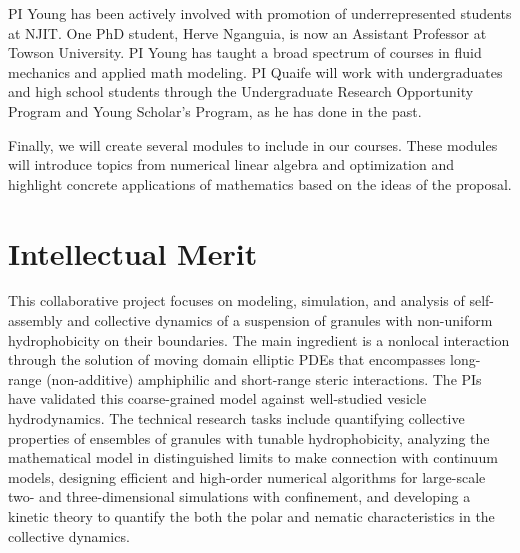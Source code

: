 PI Young has been actively involved with promotion of
underrepresented students at NJIT. One PhD student, Herve Nganguia, is
now an Assistant Professor at Towson University. PI Young has taught a
broad spectrum of courses in fluid mechanics and applied math modeling.
PI Quaife will work with undergraduates and high school
students through the Undergraduate Research Opportunity Program and
Young Scholar's Program, as he has done in the past.

Finally, we will
create several modules to include in our courses. These modules will
introduce topics from numerical linear algebra and optimization and
highlight concrete applications of mathematics based on the ideas of the
proposal.

\section{Intellectual Merit}
\label{sec:IntellectualMerit}
This collaborative project focuses on modeling, simulation, and analysis
of self-assembly and collective dynamics of a suspension of granules with 
non-uniform hydrophobicity on their boundaries. The main
ingredient is a nonlocal interaction through the solution of moving
domain elliptic PDEs that encompasses long-range (non-additive) amphiphilic and
short-range steric interactions. The PIs have validated this
coarse-grained model against well-studied vesicle hydrodynamics. The
technical research tasks include quantifying collective properties of
ensembles of granules with tunable hydrophobicity, analyzing the mathematical model in 
distinguished limits to make connection with continuum models,
designing efficient and
high-order numerical algorithms for large-scale two- and
three-dimensional simulations with confinement, and developing a kinetic
theory to quantify the both the polar and nematic characteristics in the collective dynamics.
%

